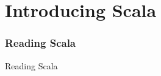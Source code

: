 \part[Introducing Scala]{Introducing Scala}
\section{Reading Scala}
\begin{frame}{Reading Scala}

\end{frame}